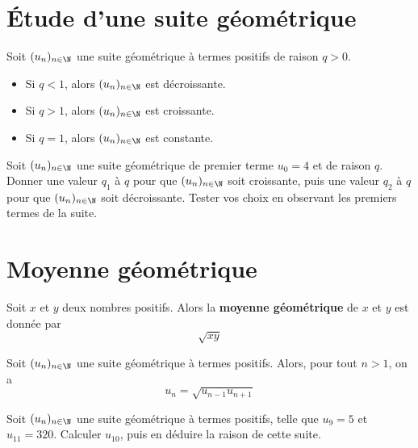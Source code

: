 \documentclass{article}
\begin{document}
\section{Étude d'une suite géométrique}
\begin{tcolorbox}
\begin{proposition}
Soit $(u_n)_{n \in \N}$ une suite géométrique à termes positifs de raison $q > 0$.
\begin{itemize}
\item Si $q < 1$, alors $(u_n)_{n \in \N}$ est décroissante. 
\item Si $q > 1$, alors $(u_n)_{n \in \N}$ est croissante. 
\item Si $q = 1$, alors $(u_n)_{n \in \N}$ est constante. 
\end{itemize}
\end{proposition}
\end{tcolorbox}
\begin{example}
Soit $(u_n)_{n \in \N}$ une suite géométrique de premier terme $u_0 = 4$ et de raison $q$. Donner une valeur $q_1$ à $q$ pour que $(u_n)_{n \in \N}$ soit croissante, puis une valeur $q_2$ à $q$ pour que $(u_n)_{n \in \N}$ soit décroissante. Tester vos choix en observant les premiers termes de la suite.
\vspace*{0.5cm}

\emptybox{4cm}
\end{example}
\section{Moyenne géométrique}
\begin{tcolorbox}
\begin{definition}
Soit $x$ et $y$ deux nombres positifs. Alors la \textbf{moyenne géométrique} de $x$ et $y$ est donnée par
\begin{equation*}
\sqrt{xy}
\end{equation*}        
\end{definition}
\end{tcolorbox}
\begin{proposition}
Soit $(u_n)_{n \in \N}$ une suite géométrique à termes positifs. Alors, pour tout $n > 1$, on a
\begin{equation*}
u_n = \sqrt{u_{n-1}u_{n+1}}
\end{equation*}
\end{proposition}
\begin{example}
Soit $(u_n)_{n \in \N}$ une suite géométrique à termes positifs, telle que $u_9 = 5$ et $u_{11} = 320$. Calculer $u_{10}$, puis en déduire la raison de cette suite.
\vspace*{0.5cm}

\emptybox{3cm}
\end{example}
\newpage
\end{document}
